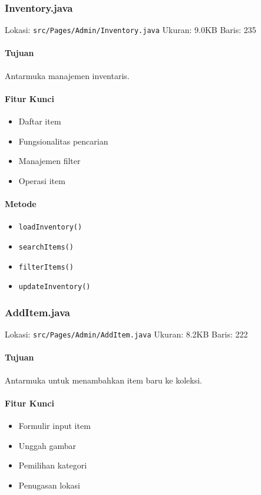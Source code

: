 \documentclass[12pt,a4paper]{article}
\begin{document}
\subsubsection{Inventory.java}
Lokasi: \texttt{src/Pages/Admin/Inventory.java}
Ukuran: 9.0KB
Baris: 235

\paragraph{Tujuan}
Antarmuka manajemen inventaris.

\paragraph{Fitur Kunci}
\begin{itemize}
    \item Daftar item
    \item Fungsionalitas pencarian
    \item Manajemen filter
    \item Operasi item
\end{itemize}

\paragraph{Metode}
\begin{itemize}
    \item \texttt{loadInventory()}
    \item \texttt{searchItems()}
    \item \texttt{filterItems()}
    \item \texttt{updateInventory()}
\end{itemize}

\subsubsection{AddItem.java}
Lokasi: \texttt{src/Pages/Admin/AddItem.java}
Ukuran: 8.2KB
Baris: 222

\paragraph{Tujuan}
Antarmuka untuk menambahkan item baru ke koleksi.

\paragraph{Fitur Kunci}
\begin{itemize}
    \item Formulir input item
    \item Unggah gambar
    \item Pemilihan kategori
    \item Penugasan lokasi
\end{itemize}
\end{document}
